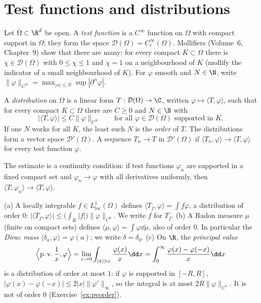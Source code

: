 \section{Test functions and distributions}

Let $\Omega\subset\R^d$ be open. A \emph{test function} is a $C^\infty$ function on $\Omega$ with compact support in $\Omega$; they form the space $\mathcal D(\Omega)=C_c^\infty(\Omega)$. Mollifiers (Volume~6, Chapter~9) show that there are
many: for every compact $K\subset\Omega$ there is $\chi\in\mathcal D(\Omega)$ with $0\le\chi\le1$ and $\chi=1$ on a neighbourhood of $K$ (mollify the indicator of a small neighbourhood of $K$). For $\varphi$ smooth and $N\in\N$, write
$\|\varphi\|_{C^N}=\max_{|\alpha|\le N}\sup|\partial^\alpha\varphi|$.

\begin{definition}
A \emph{distribution} on $\Omega$ is a linear form $T:\mathcal D(\Omega)\to\C$, written $\varphi\mapsto\langle T,\varphi\rangle$, such that for every compact $K\subset\Omega$ there are $C\ge0$ and $N\in\N$ with
\[|\langle T,\varphi\rangle|\le C\|\varphi\|_{C^N}\qquad\text{for all }\varphi\in\mathcal D(\Omega)\text{ supported in }K.\]
If one $N$ works for all $K$, the least such $N$ is the \emph{order} of $T$. The distributions form a vector space $\mathcal D'(\Omega)$. A sequence $T_n\to T$ in $\mathcal D'(\Omega)$ if $\langle T_n,\varphi\rangle\to\langle T,\varphi\rangle$ for every
test function $\varphi$.
\end{definition}

The estimate is a continuity condition: if test functions $\varphi_n$ are supported in a fixed compact set and $\varphi_n\to\varphi$ with all derivatives uniformly, then $\langle T,\varphi_n\rangle\to\langle T,\varphi\rangle$.

\begin{example}\label{ex:distexamples}
(a) A locally integrable $f\in L^1_{\mathrm{loc}}(\Omega)$ defines $\langle T_f,\varphi\rangle=\int f\varphi$, a distribution of order $0$: $|\langle T_f,\varphi\rangle|\le\bigl(\int_K|f|\bigr)\|\varphi\|_{C^0}$. We write $f$ for $T_f$.
(b) A Radon measure $\mu$ (finite on compact sets) defines $\langle\mu,\varphi\rangle=\int\varphi\dd\mu$, also of order $0$. In particular the \emph{Dirac mass} $\langle\delta_a,\varphi\rangle=\varphi(a)$; we write $\delta=\delta_0$.
(c) On $\R$, the \emph{principal value}
\[\Bigl\langle\operatorname{p.v.}\frac1x,\varphi\Bigr\rangle=\lim_{\varepsilon\to0}\int_{|x|>\varepsilon}\frac{\varphi(x)}x\dd x=\int_0^\infty\frac{\varphi(x)-\varphi(-x)}x\dd x\]
is a distribution of order at most $1$: if $\varphi$ is supported in $[-R,R]$, $|\varphi(x)-\varphi(-x)|\le2|x|\|\varphi'\|_\infty$, so the integral is at most $2R\|\varphi\|_{C^1}$. It is not of order $0$
(Exercise~\ref{ex:pvorder}).
\end{example}

